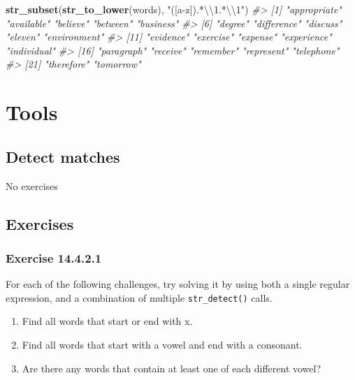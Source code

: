 \documentclass[]{book}
\newenvironment{Shaded}{\begin{snugshade}}{\end{snugshade}}
\newcommand{\CharTok}[1]{\textcolor[rgb]{0.31,0.60,0.02}{#1}}
\newcommand{\CommentTok}[1]{\textcolor[rgb]{0.56,0.35,0.01}{\textit{#1}}}
\newcommand{\KeywordTok}[1]{\textcolor[rgb]{0.13,0.29,0.53}{\textbf{#1}}}
\newcommand{\NormalTok}[1]{#1}
\newcommand{\StringTok}[1]{\textcolor[rgb]{0.31,0.60,0.02}{#1}}
\providecommand{\tightlist}{%
  \setlength{\itemsep}{0pt}\setlength{\parskip}{0pt}}
\theoremstyle{plain}
\theoremstyle{remark}
\begin{document}
\begin{enumerate}
\begin{Shaded}
\begin{Highlighting}[]
\KeywordTok{str_subset}\NormalTok{(}\KeywordTok{str_to_lower}\NormalTok{(words), }\StringTok{"([a-z]).*}\CharTok{\textbackslash{}\textbackslash{}}\StringTok{1.*}\CharTok{\textbackslash{}\textbackslash{}}\StringTok{1"}\NormalTok{)}
\CommentTok{#>  [1] "appropriate" "available"   "believe"     "between"     "business"   }
\CommentTok{#>  [6] "degree"      "difference"  "discuss"     "eleven"      "environment"}
\CommentTok{#> [11] "evidence"    "exercise"    "expense"     "experience"  "individual" }
\CommentTok{#> [16] "paragraph"   "receive"     "remember"    "represent"   "telephone"  }
\CommentTok{#> [21] "therefore"   "tomorrow"}
\end{Highlighting}
\end{Shaded}
\end{enumerate}

\hypertarget{tools}{%
\section{Tools}\label{tools}}

\hypertarget{detect-matches}{%
\subsection{Detect matches}\label{detect-matches}}

No exercises

\hypertarget{exercises-1}{%
\subsection{Exercises}\label{exercises-1}}

\hypertarget{exercise-14.4.2.1}{%
\subsubsection*{\texorpdfstring{Exercise
{14.4.2.1}}{Exercise 14.4.2.1}}\label{exercise-14.4.2.1}}

For each of the following challenges, try solving it by using both a
single regular expression, and a combination of multiple
\texttt{str\_detect()} calls.

\begin{enumerate}
\def\labelenumi{\arabic{enumi}.}
\tightlist
\item
  Find all words that start or end with x.
\item
  Find all words that start with a vowel and end with a consonant.
\item
  Are there any words that contain at least one of each different vowel?
\end{enumerate}
\end{document}
